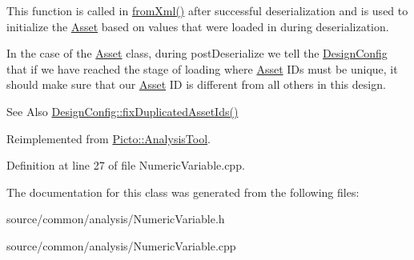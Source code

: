 This function is called in \hyperlink{class_picto_1_1_asset_a8bed4da09ecb1c07ce0dab313a9aba67}{from\-Xml()} after successful deserialization and is used to initialize the \hyperlink{class_picto_1_1_asset}{Asset} based on values that were loaded in during deserialization. 

In the case of the \hyperlink{class_picto_1_1_asset}{Asset} class, during post\-Deserialize we tell the \hyperlink{class_picto_1_1_design_config}{Design\-Config} that if we have reached the stage of loading where \hyperlink{class_picto_1_1_asset}{Asset} I\-Ds must be unique, it should make sure that our \hyperlink{class_picto_1_1_asset}{Asset} I\-D is different from all others in this design. \begin{DoxySeeAlso}{See Also}
\hyperlink{class_picto_1_1_design_config_ab57e0738b97e4358ab09530cd6815fc0}{Design\-Config\-::fix\-Duplicated\-Asset\-Ids()} 
\end{DoxySeeAlso}


Reimplemented from \hyperlink{class_picto_1_1_analysis_tool_a4e222c101573aca1ef0e271fab078eaa}{Picto\-::\-Analysis\-Tool}.



Definition at line 27 of file Numeric\-Variable.\-cpp.



The documentation for this class was generated from the following files\-:\begin{DoxyCompactItemize}
\item 
source/common/analysis/Numeric\-Variable.\-h\item 
source/common/analysis/Numeric\-Variable.\-cpp\end{DoxyCompactItemize}
